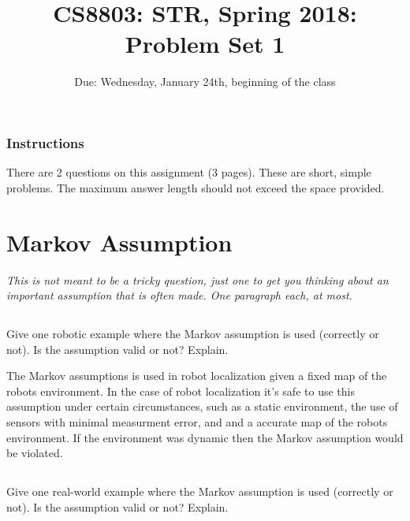 \documentclass[letterpaper]{article}
\title{CS8803: STR, Spring 2018: Problem Set 1}
\date{Due: Wednesday, January 24th, beginning of the class}
\begin{document}
\maketitle


\subsubsection*{Instructions}  There are 2 questions on this assignment (3 pages).  These are short, simple problems. The maximum answer length should not exceed the space provided.


\section{Markov Assumption}
\emph{This is not meant to be a tricky question, just one to get you thinking about an important assumption that is often made. One paragraph each, at most.}


\subsection{}
Give one robotic example where the Markov assumption is used (correctly or not).  Is the assumption valid or not?  Explain.

\vspace{5mm}

The Markov assumptions is used in robot localization given a fixed map of the robots environment. In the case of robot localization it's safe to use this assumption under certain circumstances, such as a static environment, the use of sensors with minimal measurment error, and and a accurate map of the robots environment.  If the environment was dynamic then the Markov assumption would be violated.


\subsection{}
Give one real-world example where the Markov assumption is used (correctly or not).  Is the assumption valid or not?  Explain.
\vfill

\newpage
\end{document}
